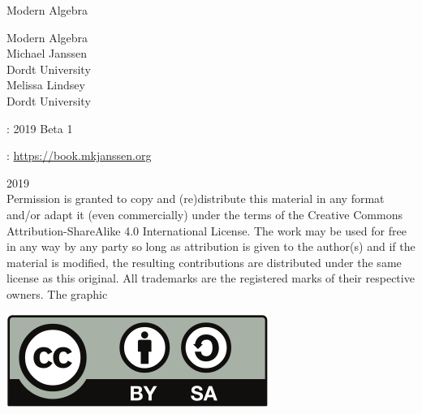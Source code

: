 \documentclass[oneside,10pt,]{book}
\numberwithin{equation}{section}
\begin{document}
\frontmatter
\thispagestyle{empty}
{\centering
\vspace*{0.28\textheight}
{\Huge Modern Algebra}\\}
\clearpage
\thispagestyle{empty}
\null%
\clearpage
\thispagestyle{empty}
{\centering
\vspace*{0.14\textheight}
{\Huge Modern Algebra}\\[3\baselineskip]
{\Large Michael Janssen}\\[0.5\baselineskip]
{\Large Dordt University}\\[3\baselineskip]
{\Large Melissa Lindsey}\\[0.5\baselineskip]
{\Large Dordt University}\\}
\clearpage
\thispagestyle{empty}
\hypertarget{g:colophon:idm416673761568}{}
: 2019 Beta 1\par\medskip
{}: \href{https:\slash{}\slash{}book.mkjanssen.org}{https:\slash{}\slash{}book.mkjanssen.org}\par\medskip
\noindent\textcopyright{}2019\textendash{}\quad{}\\[0.5\baselineskip]
Permission is granted to copy and (re)distribute this material in any format and\slash{}or adapt it (even commercially) under the terms of the Creative Commons Attribution-ShareAlike 4.0 International License.  The work may be used for free in any way by any party so long as attribution is given to the author(s) and if the material is modified, the resulting contributions are distributed under the same license as this original.  All trademarks\texttrademark{} are the registered\textregistered{} marks of their respective owners. The graphic \begin{sidebyside}{1}{0.375}{0.375}{0}%
\begin{sbspanel}{0.25}%
\includegraphics[width=1\linewidth]{images/CC-BY-SA-license}
\end{sbspanel}%
\end{sidebyside}%
\end{document}
